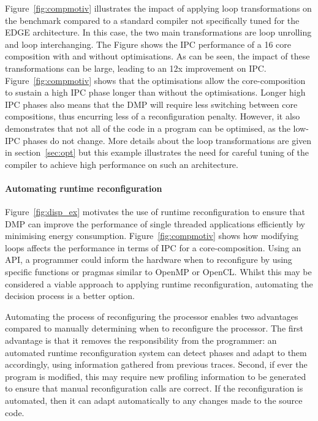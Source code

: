 Figure~\ref{fig:compmotiv} illustrates the impact of applying loop transformations on the  benchmark compared to a standard compiler not specifically tuned for the EDGE architecture.
In this case, the two main transformations are loop unrolling and loop interchanging.
The Figure shows the IPC performance of a 16 core composition with and without optimisations.
As can be seen, the impact of these transformations can be large, leading to an 12x improvement on IPC.
Figure~\ref{fig:compmotiv} shows that the optimisations allow the core-composition to sustain a high IPC phase longer than without the optimisations.
Longer high IPC phases also means that the DMP will require less switching between core compositions, thus encurring less of a reconfiguration penalty.
However, it also demonstrates that not all of the code in a program can be optimised, as the low-IPC phases do not change.
More details about the loop transformations are given in section~\ref{sec:opt} but this example illustrates the need for careful tuning of the compiler to achieve high performance on such an architecture.

\paragraph{Automating runtime reconfiguration}

Figure~\ref{fig:disp_ex} motivates the use of runtime reconfiguration to ensure that DMP can improve the performance of single threaded applications efficiently by minimising energy consumption.
Figure~\ref{fig:compmotiv} shows how modifying loops affects the performance in terms of IPC for a core-composition.
Using an API, a programmer could inform the hardware when to reconfigure by using specific functions or pragmas similar to OpenMP or OpenCL.
Whilst this may be considered a viable approach to applying runtime reconfiguration, automating the decision process is a better option.

Automating the process of reconfiguring the processor enables two advantages compared to manually determining when to reconfigure the processor.
The first advantage is that it removes the responsibility from the programmer: an automated runtime reconfiguration system can detect phases and adapt to them accordingly, using information gathered from previous traces.
Second, if ever the program is modified, this may require new profiling information to be generated to ensure that manual reconfiguration calls are correct.
If the reconfiguration is automated, then it can adapt automatically to any changes made to the source code.

